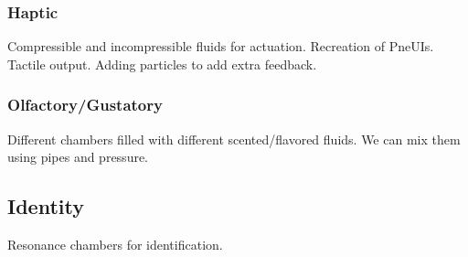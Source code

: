 \subsubsection{Haptic}
Compressible and incompressible fluids for actuation.  Recreation of PneUIs.  Tactile output.  Adding particles to add extra feedback.

\subsubsection{Olfactory/Gustatory}
Different chambers filled with different scented/flavored fluids.  We can mix them using pipes and pressure.

\subsection{Identity}
Resonance chambers for identification.